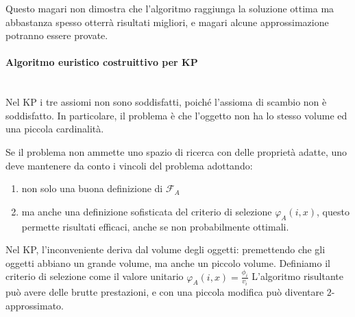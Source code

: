 \documentclass{article}
\begin{document}
Questo magari non dimostra che l'algoritmo raggiunga la soluzione ottima ma abbastanza spesso otterrà
risultati migliori, e magari alcune approssimazione potranno essere provate.

\paragraph{Algoritmo euristico costruittivo per KP}\mbox{}\\
Nel KP i tre assiomi non sono soddisfatti, poiché l'assioma di scambio non è soddisfatto.
In particolare, il problema è che l'oggetto non ha lo stesso volume ed una piccola cardinalità.

Se il problema non ammette uno spazio di ricerca con delle proprietà adatte, uno deve mantenere
da conto i vincoli del problema adottando:
\begin{enumerate}
    \item non solo una buona definizione di $\mathcal{F}_A$
    \item ma anche una definizione sofisticata del criterio di selezione $\varphi_A(i,x)$,
          questo permette risultati efficaci, anche se non probabilmente ottimali.
\end{enumerate}
Nel KP, l'inconveniente deriva dal volume degli oggetti: premettendo che gli oggetti abbiano
un grande volume, ma anche un piccolo volume. Definiamo il criterio di selezione come il
valore unitario $\varphi_A(i,x)=\frac{\phi_i}{v_i}$
L'algoritmo risultante può avere delle brutte prestazioni, e con una piccola modifica può diventare
$2$-approssimato.
\end{document}
